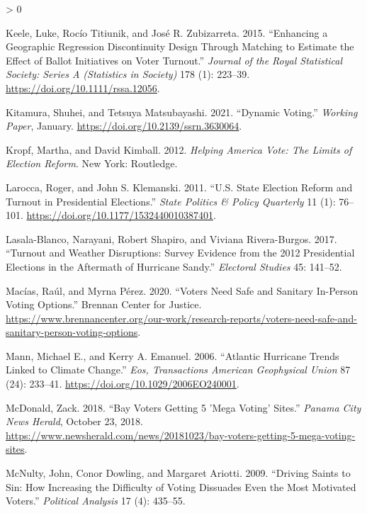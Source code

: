 \documentclass[
  12pt,
]{article}
\newlength{\cslhangindent}
\newenvironment{CSLReferences}[2] %
 {%
  \setlength{\parindent}{0pt}
  \ifodd #1 \everypar{\setlength{\hangindent}{\cslhangindent}}\ignorespaces\fi
  \ifnum #2 > 0
  \setlength{\parskip}{#2\baselineskip}
  \fi
 }%
 {}
\begin{document}
\begin{CSLReferences}{1}{0}
\leavevmode\hypertarget{ref-Keele2015a}{}%
Keele, Luke, Rocío Titiunik, and José R. Zubizarreta. 2015. {``Enhancing a Geographic Regression Discontinuity Design Through Matching to Estimate the Effect of Ballot Initiatives on Voter Turnout.''} \emph{Journal of the Royal Statistical Society: Series A (Statistics in Society)} 178 (1): 223--39. \url{https://doi.org/10.1111/rssa.12056}.

\leavevmode\hypertarget{ref-Kitamura2021}{}%
Kitamura, Shuhei, and Tetsuya Matsubayashi. 2021. {``Dynamic {Voting}.''} \emph{Working Paper}, January. \url{https://doi.org/10.2139/ssrn.3630064}.

\leavevmode\hypertarget{ref-Kropf2012}{}%
Kropf, Martha, and David Kimball. 2012. \emph{Helping {America Vote}: {The Limits} of {Election Reform}}. {New York}: {Routledge}.

\leavevmode\hypertarget{ref-Larocca2011}{}%
Larocca, Roger, and John S. Klemanski. 2011. {``U.{S}. {State Election Reform} and {Turnout} in {Presidential Elections}.''} \emph{State Politics \& Policy Quarterly} 11 (1): 76--101. \url{https://doi.org/10.1177/1532440010387401}.

\leavevmode\hypertarget{ref-Lasala-Blanco2017}{}%
Lasala-Blanco, Narayani, Robert Shapiro, and Viviana Rivera-Burgos. 2017. {``Turnout and {Weather Disruptions}: {Survey Evidence} from the 2012 {Presidential Elections} in the {Aftermath} of {Hurricane Sandy}.''} \emph{Electoral Studies} 45: 141--52.

\leavevmode\hypertarget{ref-Macias2020}{}%
Macías, Raúl, and Myrna Pérez. 2020. {``Voters {Need Safe} and {Sanitary In}-{Person Voting Options}.''} {Brennan Center for Justice}. \url{https://www.brennancenter.org/our-work/research-reports/voters-need-safe-and-sanitary-person-voting-options}.

\leavevmode\hypertarget{ref-Mann2006}{}%
Mann, Michael E., and Kerry A. Emanuel. 2006. {``Atlantic Hurricane Trends Linked to Climate Change.''} \emph{Eos, Transactions American Geophysical Union} 87 (24): 233--41. \url{https://doi.org/10.1029/2006EO240001}.

\leavevmode\hypertarget{ref-McDonald2018}{}%
McDonald, Zack. 2018. {``Bay Voters Getting 5 'Mega Voting' Sites.''} \emph{Panama City News Herald}, October 23, 2018. \url{https://www.newsherald.com/news/20181023/bay-voters-getting-5-mega-voting-sites}.

\leavevmode\hypertarget{ref-McNulty2009}{}%
McNulty, John, Conor Dowling, and Margaret Ariotti. 2009. {``Driving {Saints} to {Sin}: {How Increasing} the {Difficulty} of {Voting Dissuades Even} the {Most Motivated Voters}.''} \emph{Political Analysis} 17 (4): 435--55.


\end{CSLReferences}
\end{document}
